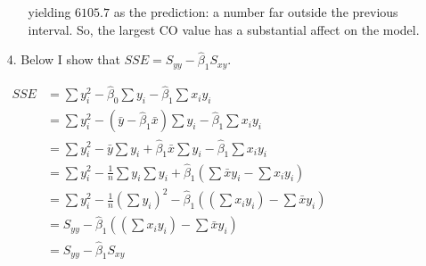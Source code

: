 \documentclass[12pt]{article}
\begin{document}
\begin{enumerate}
\begin{enumerate}
			yielding $6105.7$ as the prediction: a number far outside the previous interval. So, 
			the largest CO value has a substantial affect on the model.
		\end{enumerate}
	\item[4.] Below I show that $SSE = S_{yy} - \hat{\beta}_1S_{xy}$.
		\begin{center}
		\begin{math}
		\begin{aligned}
			SSE &= \sum{y^2_i} - \hat{\beta}_0\sum{y_i} - \hat{\beta}_1\sum{x_iy_i}\\
			&= \sum{y^2_i} - (\bar{y} - \hat{\beta}_1\bar{x})\sum{y_i} - \hat{\beta}_1\sum{x_iy_i}\\
			&= \sum{y^2_i} -\bar{y}\sum{y_i} + \hat{\beta}_1\bar{x}\sum{y_i} - \hat{\beta}_1\sum{x_iy_i}\\
			&= \sum{y^2_i} -\frac{1}{n}\sum{y_i}\sum{y_i} + \hat{\beta}_1(\sum\bar{x}{y_i} - \sum{x_iy_i})\\
			&= \sum{y^2_i} -\frac{1}{n}(\sum{y_i})^2 - \hat{\beta}_1((\sum{x_iy_i}) - \sum{\bar{x}y_i})\\
			&= S_{yy} - \hat{\beta}_1((\sum{x_iy_i}) - \sum{\bar{x}y_i})\\
			&= S_{yy} - \hat{\beta}_1S_{xy}\\
		\end{aligned}
		\end{math}
		\end{center}

\end{enumerate}
\end{document}
